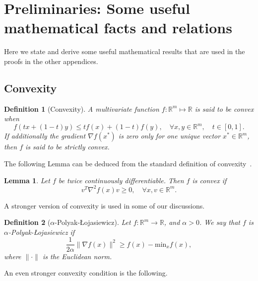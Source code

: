 \documentclass[
    aps,
    prx,
    floatfix,
    nofootinbib,
    onecolumn
]{revtex4-2}
\newtheorem{definition}{Definition}
\newtheorem{lemma}{Lemma}
\begin{document}
\section{Preliminaries: Some useful mathematical facts and relations}
\label{app:mathfacts}

Here we state and derive some useful mathematical results that are used in the proofs in the other appendices. 

\subsection{Convexity}

\begin{definition}[Convexity]
\label{def:convexity}
A multivariate function $f:\mathbb{R}^m \mapsto \mathbb{R}$ is said to be convex when 
\begin{equation}
    f(tx + (1-t)y) \leq tf(x) + (1-t)f(y), \quad \forall x, y\in\mathbb{R}^m, \quad t\in [0, 1]. 
\end{equation}
If additionally the gradient $\nabla f(x^*)$ is zero only for one unique vector $x^* \in\mathbb{R}^m$, then $f$ is said to be strictly convex.
\end{definition}

The following Lemma can be deduced from the standard definition of convexity~\cite{Garrigos2023}. 

\begin{lemma}
\label{lem:convexity}
Let $f$ be twice continuously differentiable. Then $f$ is convex if 
\begin{equation}
\label{eq:convex} 
    v^T \nabla^2 f(x) v \geq 0, \quad \forall x,v \in \mathbb{R}^m . 
\end{equation}
\end{lemma} 

A stronger version of convexity is used in some of our discussions.

\begin{definition}[$\alpha$-Polyak-{\L}ojasiewicz]
\label{def:PL}
Let $f : \mathbb{R}^m \rightarrow \mathbb{R}$, and $\alpha > 0$. We say that $f$ is $\alpha$-Polyak-{\L}ojasiewicz if 
\begin{equation}
\frac{1}{2\alpha}\|\nabla f(x)\|^2 \geq f(x) - \mathrm{min}_x f(x),
\end{equation} 
where $\| \cdot \|$ is the Euclidean norm.
\end{definition}

An even stronger convexity condition is the following.
\end{document}
